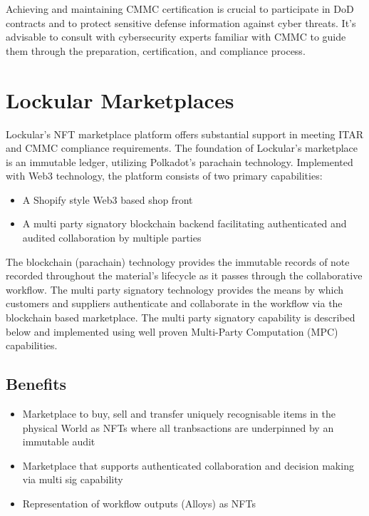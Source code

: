 \documentclass{tufte-handout}
\begin{document}
Achieving and maintaining CMMC certification is crucial to participate in DoD contracts and to protect sensitive defense information against cyber threats. It's advisable
to consult with cybersecurity experts familiar with CMMC to guide them through the preparation, certification, and compliance process.


\section{Lockular Marketplaces}\label{sec:page-layout}
Lockular's NFT marketplace platform offers substantial support in meeting ITAR and CMMC compliance requirements. The foundation of Lockular's marketplace is an immutable
ledger, utilizing Polkadot's parachain technology. Implemented with Web3 technology, the platform consists of two primary capabilities:
\begin{itemize}
\item A Shopify style Web3 based shop front
\item A multi party signatory blockchain backend facilitating authenticated and audited collaboration by multiple parties
\end{itemize}

The blockchain (parachain) technology provides the immutable records of note recorded throughout the material's lifecycle as it passes through the collaborative workflow.
The multi party signatory technology provides the means by which customers and suppliers authenticate and collaborate in the workflow via the blockchain based marketplace.
The multi party signatory capability is described below and implemented using well proven Multi-Party Computation (MPC) capabilities\cite{Finck2018}.

\subsection{Benefits}\label{sec:headings}
\begin{itemize}
	\item Marketplace to buy, sell and transfer uniquely recognisable items in the physical World as NFTs where all tranbsactions are underpinned by an immutable audit
	\item Marketplace that supports authenticated collaboration and decision making via multi sig capability
	\item Representation of workflow outputs (Alloys) as NFTs
\end{itemize}
\end{document}
